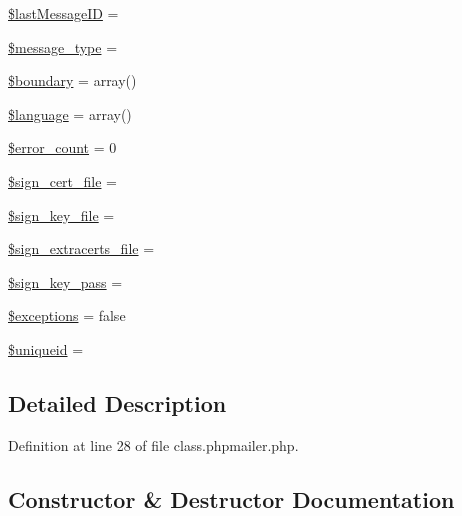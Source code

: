 \begin{DoxyCompactItemize}
\item 
\hyperlink{class_p_h_p_mailer_a974888b4d036404356394cf76035174d}{\$last\+Message\+ID} = \textquotesingle{}\textquotesingle{}
\item 
\hyperlink{class_p_h_p_mailer_a538e1d253d02a1664a29a632e549b070}{\$message\+\_\+type} = \textquotesingle{}\textquotesingle{}
\item 
\hyperlink{class_p_h_p_mailer_a324c46222153b175ed4ea28967c75483}{\$boundary} = array()
\item 
\hyperlink{class_p_h_p_mailer_a83170d318260a5a2e2a79dccdd371b10}{\$language} = array()
\item 
\hyperlink{class_p_h_p_mailer_a7cdeffef92c4734cc7f303a7bea0711d}{\$error\+\_\+count} = 0
\item 
\hyperlink{class_p_h_p_mailer_a333572c0adf8b31023c7d868e20b8b8b}{\$sign\+\_\+cert\+\_\+file} = \textquotesingle{}\textquotesingle{}
\item 
\hyperlink{class_p_h_p_mailer_a984a5cd10ea13b5c25b9088004469712}{\$sign\+\_\+key\+\_\+file} = \textquotesingle{}\textquotesingle{}
\item 
\hyperlink{class_p_h_p_mailer_ae510d44770a6bd6f11170a5d88c0d6fc}{\$sign\+\_\+extracerts\+\_\+file} = \textquotesingle{}\textquotesingle{}
\item 
\hyperlink{class_p_h_p_mailer_ad6ab22b5338f0053e25887fde1f7fd47}{\$sign\+\_\+key\+\_\+pass} = \textquotesingle{}\textquotesingle{}
\item 
\hyperlink{class_p_h_p_mailer_a7b3cdaf64a0a391d40bc8ecd4008218a}{\$exceptions} = false
\item 
\hyperlink{class_p_h_p_mailer_ab47f297d32c3522f1f7d42ed911157fd}{\$uniqueid} = \textquotesingle{}\textquotesingle{}
\end{DoxyCompactItemize}


\subsection{Detailed Description}


Definition at line 28 of file class.\+phpmailer.\+php.



\subsection{Constructor \& Destructor Documentation}
